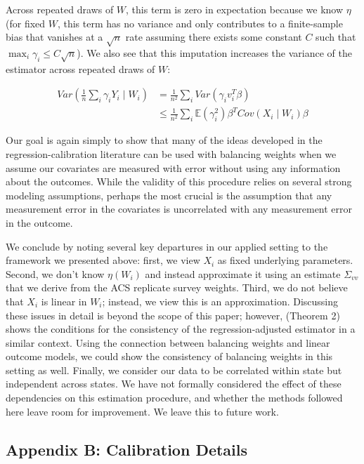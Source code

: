 \documentclass[12pt]{article}
\begin{document}
Across repeated draws of $W$, this term is zero in expectation because we know $\eta$ (for fixed $W$, this term has no variance and only contributes to a finite-sample bias that vanishes at a $\sqrt{n}$ rate assuming there exists some constant $C$ such that $\max_i \gamma_i \le C\sqrt{n}$). We also see that this imputation increases the variance of the estimator across repeated draws of $W$:

\begin{align*}
    Var(\frac{1}{n}\sum_i \gamma_i Y_i \mid W_i) &= \frac{1}{n^2}\sum_i Var(\gamma_iv_i^T\beta) \\
    &\le \frac{1}{n^2}\sum_i\mathbb{E}(\gamma_i^2)\beta^TCov(X_i \mid W_i)\beta 
\end{align*}

Our goal is again simply to show that many of the ideas developed in the regression-calibration literature can be used with balancing weights when we assume our covariates are measured with error without using any information about the outcomes. While the validity of this procedure relies on several strong modeling assumptions, perhaps the most crucial is the assumption that any measurement error in the covariates is uncorrelated with any measurement error in the outcome. 

We conclude by noting several key departures in our applied setting to the framework we presented above: first, we view $X_i$ as fixed underlying parameters. Second, we don't know $\eta(W_i)$ and instead approximate it using an estimate $\Sigma_{vv}$ that we derive from the ACS replicate survey weights. Third, we do not believe that $X_i$ is linear in $W_i$; instead, we view this is an approximation. Discussing these issues in detail is beyond the scope of this paper; however, \cite{gleser1992importance} (Theorem 2) shows the conditions for the consistency of the regression-adjusted estimator in a similar context. Using the connection between balancing weights and linear outcome models, we could show the consistency of balancing weights in this setting as well. Finally, we consider our data to be correlated within state but independent across states. We have not formally considered the effect of these dependencies on this estimation procedure, and whether the methods followed here leave room for improvement. We leave this to future work.

\subsection{Appendix B: Calibration Details}
\end{document}
